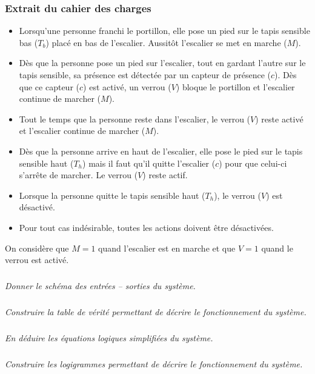 \documentclass[10pt]{article}
\begin{document}
\subsubsection*{Extrait du cahier des charges}
\begin{itemize}
\item Lorsqu'une personne franchi le portillon, elle pose un pied sur le tapis sensible bas ($T_b$) placé en bas de l'escalier. Aussitôt l'escalier se met en marche ($M$).
\item Dès que la personne pose un pied sur l'escalier, tout en gardant l'autre sur le tapis sensible, sa présence est détectée par un capteur de présence ($c$). Dès que ce capteur ($c$) est activé, un verrou ($V$) bloque le portillon et l'escalier continue de marcher ($M$).
\item Tout le temps que la personne reste dans l'escalier, le verrou ($V$) reste activé et l'escalier continue de marcher ($M$).
\item Dès que la personne arrive en haut de l'escalier, elle pose le pied sur le tapis sensible haut ($T_h$) mais il faut qu'il quitte l'escalier ($c$) pour que celui-ci s'arrête de marcher. Le verrou ($V$) reste actif. 
\item Lorsque la personne quitte le tapis sensible haut ($T_h$), le verrou ($V$) est désactivé. 
\item Pour tout cas indésirable, toutes les actions doivent être désactivées.
\end{itemize}

On considère que $M=1$ quand l'escalier est en marche et que $V=1$ quand le verrou est activé. 

\subparagraph{}
\textit{Donner le schéma des entrées -- sorties du système.}

\subparagraph{}
\textit{Construire la table de vérité permettant de décrire le fonctionnement du système.}

\subparagraph{}
\textit{En déduire les équations logiques simplifiées du système.}

\subparagraph{}
\textit{Construire les logigrammes permettant de décrire le fonctionnement du système.}
\end{document}
